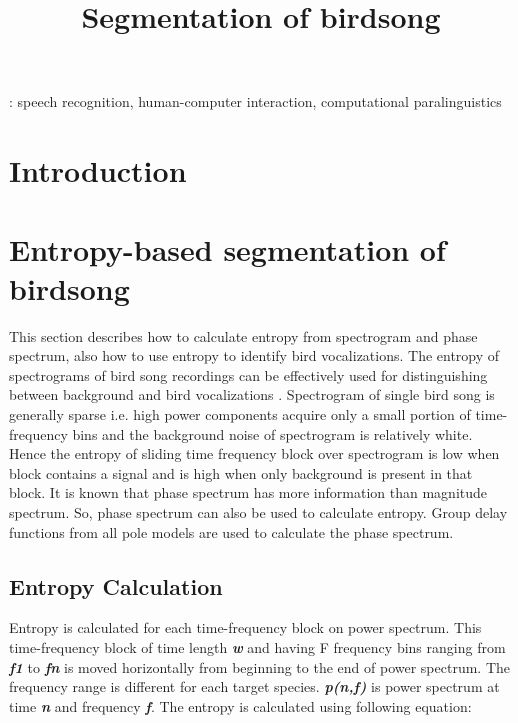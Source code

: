 \documentclass[a4paper]{article}
\title{Segmentation of birdsong}
\begin{document}
  \maketitle
  \begin{abstract}
  \end{abstract}
  : speech recognition, human-computer interaction, computational paralinguistics



  \section{Introduction}

\section{Entropy-based segmentation of birdsong}
This section describes how to calculate entropy from spectrogram and phase spectrum, also how to use entropy to identify bird vocalizations. The entropy of spectrograms of bird song recordings can be effectively used for distinguishing between background and bird vocalizations \cite{6625329}. Spectrogram of single bird song is generally sparse i.e. high power components acquire only a small portion of time-frequency bins and the background noise of spectrogram is relatively white. Hence  the entropy of sliding time frequency block over spectrogram is low when block contains a signal and is high when only background is present in that block. It is known that phase spectrum has more information than magnitude spectrum. So, phase spectrum can also be used to calculate entropy. Group delay functions from all pole models are used to calculate the phase spectrum. 

\subsection{Entropy Calculation}
Entropy is calculated for each time-frequency block on power spectrum. This time-frequency block of time length \textbf{\textit{w}} and having F frequency bins ranging from \textbf{\textit{f1}} to  \textbf{\textit{fn}} is moved horizontally from beginning to the end of power spectrum. The frequency range is different for each target species. \textbf{\textit{p(n,f)}} is power spectrum at time \textbf{\textit{n}} and frequency  \textbf{\textit{f}}. The entropy is calculated using following equation:

\hspace{1cm}
\end{document}
